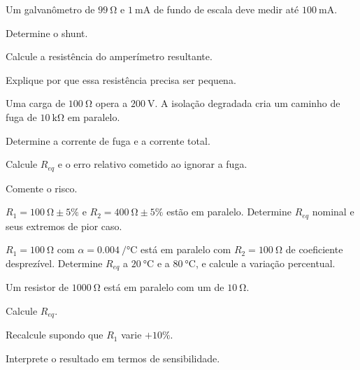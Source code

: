 \begin{questao}[3]{}

Um galvanômetro de $\SI{99}{\ohm}$ e $\SI{1}{\milli\ampere}$ de fundo de escala
deve medir até $\SI{100}{\milli\ampere}$.
\begin{itensq}
\item Determine o shunt.
\item Calcule a resistência do amperímetro resultante.
\item Explique por que essa resistência precisa ser pequena.
\end{itensq}


\end{questao}
\begin{questao}[3]{}

Uma carga de $\SI{100}{\ohm}$ opera a $\SI{200}{\volt}$. A isolação
degradada cria um caminho de fuga de $\SI{10}{\kilo\ohm}$ em paralelo.
\begin{itensq}
\item Determine a corrente de fuga e a corrente total.
\item Calcule $R_{eq}$ e o erro relativo cometido ao ignorar a fuga.
\item Comente o risco.
\end{itensq}


\end{questao}
\begin{questao}[3]{}

$R_1=\SI{100}{\ohm}\pm5\%$ e $R_2=\SI{400}{\ohm}\pm5\%$ estão em paralelo.
Determine $R_{eq}$ nominal e seus extremos de pior caso.


\end{questao}
\begin{questao}[3]{}

$R_1=\SI{100}{\ohm}$ com $\alpha=\SI{0.004}{\per\celsius}$ está em paralelo com
$R_2=\SI{100}{\ohm}$ de coeficiente desprezível. Determine $R_{eq}$ a
$\SI{20}{\celsius}$ e a $\SI{80}{\celsius}$, e calcule a variação percentual.


\end{questao}
\begin{questao}[3]{}

Um resistor de $\SI{1000}{\ohm}$ está em paralelo com um de $\SI{10}{\ohm}$.
\begin{itensq}
\item Calcule $R_{eq}$.
\item Recalcule supondo que $R_1$ varie $+10\%$.
\item Interprete o resultado em termos de sensibilidade.
\end{itensq}


\end{questao}
